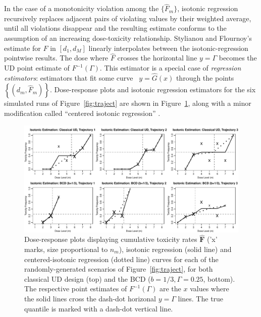 In the case of a monotonicity violation among the $\{\hat{F}_m\}$, isotonic regression recursively replaces adjacent pairs of violating values by their weighted average, until all violations disappear and the resulting estimate conforms to the assumption of an increasing dose-toxicity relationship. Stylianou and Flournoy's estimate for $F$ in $[d_1,d_M]$ linearly interpolates between the isotonic-regression pointwise results. The dose where $\hat{F}$ crosses the horizontal line $y=\Gamma$ becomes the UD point estimate of $F^{-1}(\Gamma)$. This estimator is a special case of \emph{regression estimators}: estimators that fit some curve \ $y=\hat{G}(x)$ through the points $\left\{\left(d_m,\hat{F}_m\right)\right\}$.  Dose-response plots and isotonic regression estimators for the six simulated runs of Figure~\ref{fig:traject} are shown in Figure~\ref{fig:isot}, along with a minor modification called ``centered isotonic regression'' \citep[Section~3.3]{Oron07}.

\begin{figure}
\begin{center}
\includegraphics[scale=0.65]{isot}
\caption{Dose-response plots displaying cumulative toxicity rates $\mathbf{\hat{F}}$ ('x' marks, size proportional to $n_m$), isotonic regression (solid line) and centered-isotonic regression (dotted line) curves for each of the randomly-generated scenarios of Figure~\ref{fig:traject}, for both classical UD design (top) and the BCD ($b=1/3,\Gamma=0.25$, bottom). The respective point estimates of $F^{-1}(\Gamma)$ are the $x$ values where the solid lines cross the dash-dot horizonal $y=\Gamma$ lines. The true quantile is marked with a dash-dot vertical line.}\label{fig:isot}
\end{center}
\end{figure}





